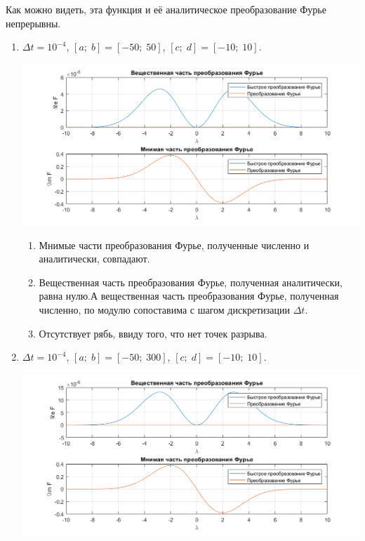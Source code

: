 \documentclass[a4paper, 11pt]{article}
\begin{document}
        Как можно видеть, эта функция и её аналитическое преобразование Фурье непрерывны.
        \begin{enumerate}
            \item
                $\Delta t = 10^{-4}$, $[a;\; b] = [-50;\; 50]$, $[c;\;d] = [-10;\;10]$.
                
                \includegraphics[width=\linewidth]{img/4.png}
                
                \begin{enumerate}
                    \item
                        Мнимые части преобразования Фурье, полученные численно и аналитически, совпадают. 
                    \item
                        Вещественная часть преобразования Фурье, полученная аналитически, равна нулю.А вещественная часть преобразования Фурье, полученная численно, по модулю сопоставима с шагом дискретизации $\Delta t$.
                    \item
                        Отсутствует рябь, ввиду того, что нет точек разрыва.
                \end{enumerate}
            
            \item
                $\Delta t = 10^{-4}$, $[a;\; b] = [-50;\; 300]$, $[c;\;d] = [-10;\;10]$.
                
                \includegraphics[width=\linewidth]{img/5.png}
                

\end{enumerate}
\end{document}
